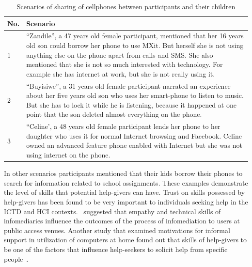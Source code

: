 \begin{table}[h!]
\begin{center}
    \caption{Scenarios of sharing of cellphones between participants and their children}
    \label{table:phone_sharing_contextual}
	\begin{tabular}{|p{1cm}|p{12cm}|}
		\hline
		 \textbf{No.}&\textbf{Scenario}\\
	\hline
	1&``Zandile'', a 47 years old female participant, mentioned that her 16 years old son could borrow her phone to use MXit. But herself she is not using anything else on the phone apart from calls and SMS. She also mentioned that she is not so much interested with technology. For example she has internet at work, but she is not really using it.\\
	\hline
  2& ``Buyisiwe'', a 31 years old female participant narrated an experience about her five years old son who uses her smart-phone to listen to music. But she has to lock it while he is listening, because it happened at one point that the son deleted almost everything on the phone.\\
  \hline 
  3&``Celine', a 48 years old female participant lends her phone to her daughter who uses it for normal Internet browsing and Facebook. Celine owned an advanced feature phone enabled with Internet but she was not using internet on the phone.\\
  \hline
	\end{tabular}
  \end{center}
\end{table}
In other scenarios participants mentioned that their kids borrow their phones to search for information related to school assignments. These examples demonstrate the level of skills that potential help-givers can have. Trust on skills possessed by help-givers has been found to be very important to individuals seeking help in the ICTD and HCI contexts.~\cite{ramirez2013infomediaries} suggested that empathy and technical skills of infomediaries influence the outcomes of the process of infomediation to users at public access venues. Another study that examined motivations for informal support in utilization of computers at home found out that skills of help-givers to be one of the factors that influence help-seekers to solicit help from specific people~\citep{poole:chh}. 
